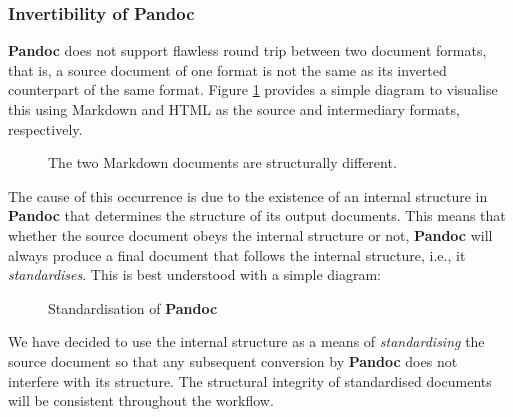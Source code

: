 \documentclass[a4paper, 12pt]{report}
\begin{document}
\subsubsection*{Invertibility of \textbf{Pandoc}}
\textbf{Pandoc} does not support flawless round trip between two document formats, that is, a source document of one format is not the same as its inverted counterpart of the same format. Figure \ref{fig:3.3} provides a simple diagram to visualise this using Markdown and HTML as the source and intermediary formats, respectively.
\begin{figure}[h!]
\centering
\caption{The two Markdown documents are structurally different.}
\label{fig:3.3}
\end{figure}

The cause of this occurrence is due to the existence of an internal structure in \textbf{Pandoc} that determines the structure of its output documents. This means that whether the source document obeys the internal structure or not, \textbf{Pandoc} will always produce a final document that follows the internal structure, i.e., it \emph{standardises}. This is best understood with a simple diagram:
\begin{figure}[h!]
\centering
\caption{Standardisation of \textbf{Pandoc}}
\end{figure}

We have decided to use the internal structure as a means of \emph{standardising} the source document so that any subsequent conversion by \textbf{Pandoc} does not interfere with its structure. The structural integrity of standardised documents will be consistent throughout the workflow.
\end{document}
